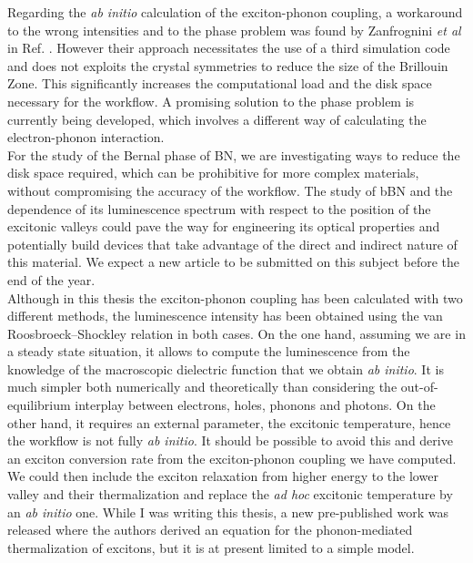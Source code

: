 Regarding the \textit{ab initio} calculation of the exciton-phonon coupling, a workaround to the wrong intensities and to the phase problem was found by Zanfrognini \textit{et al} in Ref. \cite{zanfrognini2023distinguishing}. However their approach necessitates the use of a third simulation code and does not exploits the crystal symmetries to reduce the size of the Brillouin Zone. This significantly increases the computational load and the disk space necessary for the workflow. A promising solution to the phase problem is currently being developed, which involves a different way of calculating the electron-phonon interaction.\\

For the study of the Bernal phase of BN, we are investigating ways to reduce the disk space required, which can be prohibitive for more complex materials, without compromising the accuracy of the workflow. The study of \acrshort{bBN} and the dependence of its luminescence spectrum with respect to the position of the excitonic valleys could pave the way for engineering its optical properties and potentially build devices that take advantage of the direct and indirect nature of this material. We expect a new article to be submitted on this subject before the end of the year.\\ 

Although in this thesis the exciton-phonon coupling has been calculated with two different methods, the luminescence intensity has been obtained using the van Roosbroeck--Shockley relation in both cases. On the one hand, assuming we are in a steady state situation, it allows to compute the luminescence from the knowledge of the macroscopic dielectric function that we obtain \textit{ab initio}. It is much simpler both numerically and theoretically than considering the out-of-equilibrium interplay between electrons, holes, phonons and photons. On the other hand, it requires an external parameter, the excitonic temperature, hence the workflow is not fully \textit{ab initio}. It should be possible to avoid this and derive an exciton conversion rate from the exciton-phonon coupling we have computed. We could then include the exciton relaxation from higher energy to the lower valley and their thermalization and replace the \textit{ad hoc} excitonic temperature by an \textit{ab initio} one. While I was writing this thesis, a new pre-published work was released where the authors derived an equation for the phonon-mediated thermalization of excitons,\cite{katzer2023excitonphononscattering} but it is at present limited to a simple model.\\

